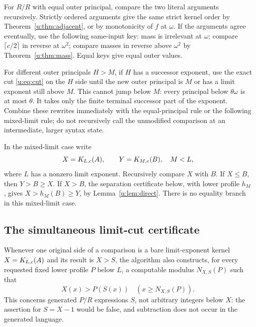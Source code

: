 For $R/R$ with equal outer principal, compare the two literal arguments
recursively. Strictly ordered arguments give the same strict kernel order
by Theorem~\ref{u:thm:adjacent}, or by monotonicity of $f$ at $\omega$.
If the arguments agree eventually, use the following same-input key:
mass is irrelevant at $\omega$; compare $\lceil c/2\rceil$ in reverse at
$\omega^2$; compare masses in reverse above $\omega^2$ by
Theorem~\ref{u:thm:mass}. Equal keys give equal outer values.

For different outer principals $H>M$, if $H$ has a successor exponent,
use the exact cut \eqref{u:eq:cut} on the $H$ side until the new outer
principal is $M$ or has a limit exponent still above $M$.
This cannot jump below $M$: every principal below $\theta\omega$ is at
most $\theta$. It takes only the finite terminal successor part of the
exponent. Combine these rewrites immediately with the equal-principal
rule or the following mixed-limit rule; do not recursively call the
unmodified comparison at an intermediate, larger syntax state.

In the mixed-limit case write
\begin{equation}
                  X=K_{L,c}(A),\qquad Y=K_{M,e}(B),\quad M<L,
                                                               \label{u:display:8-1}
\end{equation}
where $L$ has a nonzero limit exponent. Recursively compare $X$ with $B$.
If $X\le B$, then $Y>B\ge X$. If $X>B$, the separation certificate
below, with lower profile $h_M$, gives
$X>h_M(B)\ge Y$, by Lemma~\ref{u:lem:direct}. There is no equality branch
in this mixed-limit case.

\subsection{The simultaneous limit-cut certificate}
Whenever one original side of a comparison is a bare limit-exponent
kernel $X=K_{L,c}(A)$ and its result is $X>S$, the algorithm also
constructs, for every requested fixed lower profile $P$ below $L$, a
computable modulus $N_{X,S}(P)$ such that
\begin{equation}
                   X(x)>P(S(x))\quad(x\ge N_{X,S}(P)). \label{u:display:8-2}
\end{equation}
This concerns generated $P/R$ expressions $S$, not arbitrary integers
below $X$: the assertion for $S=X-1$ would be false, and subtraction
does not occur in the generated language.

